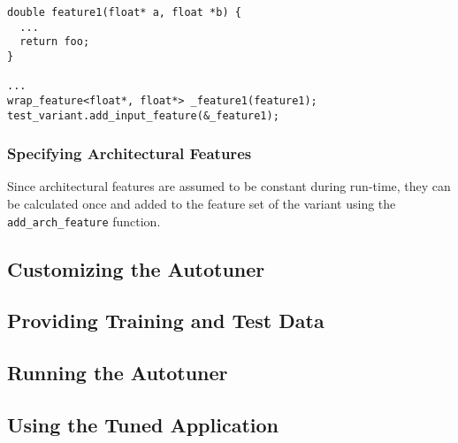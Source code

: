 \documentclass[12pt]{article}
\begin{document}
\begin{verbatim}
double feature1(float* a, float *b) {
  ...
  return foo;
}

...
wrap_feature<float*, float*> _feature1(feature1);
test_variant.add_input_feature(&_feature1);
\end{verbatim}

\subsubsection{Specifying Architectural Features}
Since architectural features are assumed to be constant during run-time,
they can be calculated once and added to the feature set of the variant
using the \texttt{add\_arch\_feature} function.

\subsection{Customizing the Autotuner}
\subsection{Providing Training and Test Data}
\subsection{Running the Autotuner}
\subsection{Using the Tuned Application}
\end{document}
